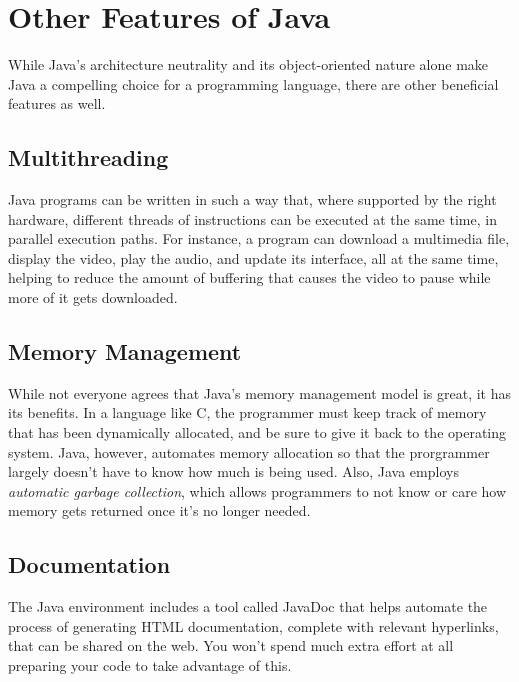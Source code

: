 \section{Other Features of Java}

While Java's architecture neutrality and its object-oriented nature alone make Java a compelling choice for a programming language, there are other beneficial features as well.

\subsection{Multithreading}

Java programs can be written in such a way that, where supported by the right hardware, different threads of instructions can be executed at the same time, in parallel execution paths.  For instance, a program can download a multimedia file, display the video, play the audio, and update its interface, all at the same time, helping to reduce the amount of buffering that causes the video to pause while more of it gets downloaded.

\subsection{Memory Management}

While not everyone agrees that Java's memory management model is great, it has its benefits.  In a language like C, the programmer must keep track of memory that has been dynamically allocated, and be sure to give it back to the operating system.  Java, however, automates memory allocation so that the prorgrammer largely doesn't have to know how much is being used.  Also, Java employs \textit{automatic garbage collection}, which allows programmers to not know or care how memory gets returned once it's no longer needed.

\subsection{Documentation}

The Java environment includes a tool called JavaDoc that helps automate the process of generating HTML documentation, complete with relevant hyperlinks, that can be shared on the web.  You won't spend much extra effort at all preparing your code to take advantage of this.
